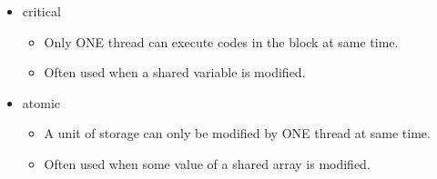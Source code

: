 \documentclass{beamer}
\begin{document}
	\begin{frame}
		\frametitle{\insertsubsection}
		\begin{itemize}
			\item critical
			\begin{itemize}
				\item Only ONE thread can execute codes in the block at same time.
				\item Often used when a shared variable is modified.
			\end{itemize}
			\item atomic
			\begin{itemize}
				\item A unit of storage can only be modified by ONE thread at same time.
				\item Often used when some value of a shared array is modified.
			\end{itemize}
		\end{itemize}
	\end{frame}
	
\end{document}
